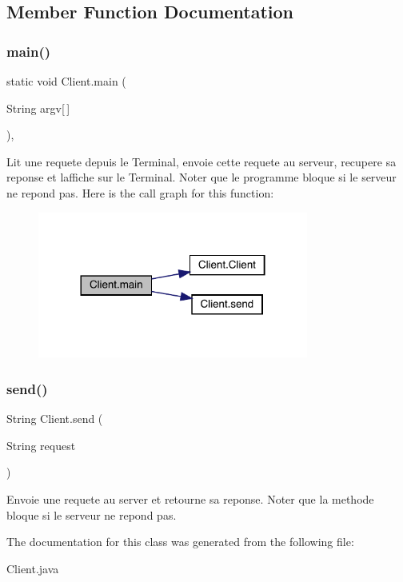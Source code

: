 \subsection{Member Function Documentation}
\mbox{\label{class_client_ac9fec818083d641b633a8e4a75d981a7}} 
\subsubsection{\texorpdfstring{main()}{main()}}
{\footnotesize\ttfamily static void Client.\+main (\begin{DoxyParamCaption}\item[{String}]{argv\mbox{[}$\,$\mbox{]} }\end{DoxyParamCaption})\hspace{0.3cm}{\ttfamily [inline]}, {\ttfamily [static]}}

Lit une requete depuis le Terminal, envoie cette requete au serveur, recupere sa reponse et l\textquotesingle{}affiche sur le Terminal. Noter que le programme bloque si le serveur ne repond pas. Here is the call graph for this function\+:
\nopagebreak
\begin{figure}[H]
\begin{center}
\leavevmode
\includegraphics[width=252pt]{class_client_ac9fec818083d641b633a8e4a75d981a7_cgraph}
\end{center}
\end{figure}
\mbox{\label{class_client_ab26831c395da92b5893066f9ce7963a4}} 
\subsubsection{\texorpdfstring{send()}{send()}}
{\footnotesize\ttfamily String Client.\+send (\begin{DoxyParamCaption}\item[{String}]{request }\end{DoxyParamCaption})\hspace{0.3cm}{\ttfamily [inline]}}

Envoie une requete au server et retourne sa reponse. Noter que la methode bloque si le serveur ne repond pas. 

The documentation for this class was generated from the following file\+:\begin{DoxyCompactItemize}
\item 
Client.\+java\end{DoxyCompactItemize}
